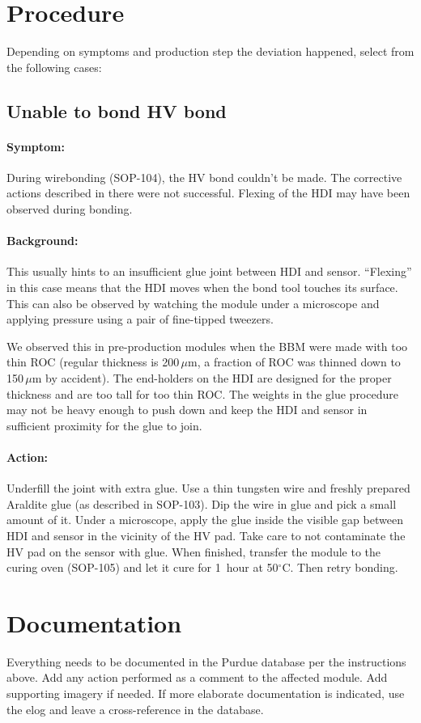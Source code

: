 \documentclass[12pt]{unlsilabsop}
\begin{document}
\section{Procedure}
Depending on symptoms and production step the deviation happened, select from the following cases:

\subsection{Unable to bond HV bond}
\paragraph{Symptom:} During wirebonding (SOP-104), the HV bond couldn't be made. The corrective actions described in there were not successful. Flexing of the HDI may have been observed during bonding.
\paragraph{Background:} This usually hints to an insufficient glue joint between HDI and sensor. ``Flexing'' in this case means that the HDI moves when the bond tool touches its surface. This can also be observed by watching the module under a microscope and applying pressure using a pair of fine-tipped tweezers.

We observed this in pre-production modules when the BBM were made with too thin ROC (regular thickness is 200\,$\mu$m, a fraction of ROC was thinned down to 150\,$\mu$m by accident). The end-holders on the HDI are designed for the proper thickness and are too tall for too thin ROC. The weights in the glue procedure may not be heavy enough to push down and keep the HDI and sensor in sufficient proximity for the glue to join.
\paragraph{Action:} Underfill the joint with extra glue. Use a thin tungsten wire and freshly prepared Araldite glue (as described in SOP-103). Dip the wire in glue and pick a small amount of it. Under a microscope, apply the glue inside the visible gap between HDI and sensor in the vicinity of the HV pad. Take care to not contaminate the HV pad on the sensor with glue. When finished, transfer the module to the curing oven (SOP-105) and let it cure for 1~hour at 50$^\circ$C. Then retry bonding.


\section{Documentation}
Everything needs to be documented in the Purdue database per the instructions above. Add any action performed as a comment to the affected module. Add supporting imagery if needed. If more elaborate documentation is indicated, use the elog and leave a cross-reference in the database.
\end{document}
